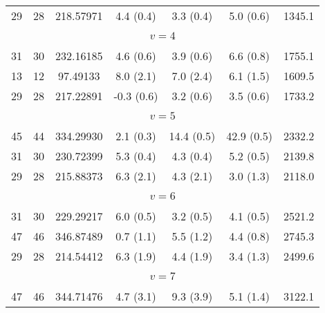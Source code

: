 \begin{table*}[htp]
\begin{tabular}{ccccccc}
 29 & 28 & 218.57971 & 4.4 (0.4) & 3.3 (0.4) & 5.0 (0.6) & 1345.1 \\
&\vspace{-0.75em}\\
\multicolumn{7}{c}{$v = 4$} \\
\vspace{-0.75em}\\
 31 & 30 & 232.16185 & 4.6 (0.6) & 3.9 (0.6) & 6.6 (0.8) & 1755.1 \\
 13 & 12 & 97.49133 & 8.0 (2.1) & 7.0 (2.4) & 6.1 (1.5) & 1609.5 \\
 29 & 28 & 217.22891 & -0.3 (0.6) & 3.2 (0.6) & 3.5 (0.6) & 1733.2 \\
&\vspace{-0.75em}\\
\multicolumn{7}{c}{$v = 5$} \\
\vspace{-0.75em}\\
 45 & 44 & 334.29930 & 2.1 (0.3) & 14.4 (0.5) & 42.9 (0.5) & 2332.2 \\
 31 & 30 & 230.72399 & 5.3 (0.4) & 4.3 (0.4) & 5.2 (0.5) & 2139.8 \\
 29 & 28 & 215.88373 & 6.3 (2.1) & 4.3 (2.1) & 3.0 (1.3) & 2118.0 \\
&\vspace{-0.75em}\\
\multicolumn{7}{c}{$v = 6$} \\
\vspace{-0.75em}\\
 31 & 30 & 229.29217 & 6.0 (0.5) & 3.2 (0.5) & 4.1 (0.5) & 2521.2 \\
 47 & 46 & 346.87489 & 0.7 (1.1) & 5.5 (1.2) & 4.4 (0.8) & 2745.3 \\
 29 & 28 & 214.54412 & 6.3 (1.9) & 4.4 (1.9) & 3.4 (1.3) & 2499.6 \\
\hline
&\vspace{-0.75em}\\
\multicolumn{7}{c}{$v = 7$} \\
\vspace{-0.75em}\\
 47 & 46 & 344.71476 & 4.7 (3.1) & 9.3 (3.9) & 5.1 (1.4) & 3122.1 \\
\end{tabular}

\par 
\end{table*}
